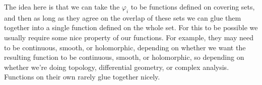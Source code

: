 \documentclass[fleqn]{NotesClass}
\begin{document}
    The idea here is that we can take the \(\varphi_i\) to be functions defined on covering sets, and then as long as they agree on the overlap of these sets we can glue them together into a single function defined on the whole set.
    For this to be possible we usually require some nice property of our functions.
    For example, they may need to be continuous, smooth, or holomorphic, depending on whether we want the resulting function to be continuous, smooth, or holomorphic, so depending on whether we're doing topology, differential geometry, or complex analysis.
    Functions on their own rarely glue together nicely.
    
    \appendixpage
    \begin{appendices}
        
        
    \end{appendices}
    \printbibliography
    \backmatter
    \renewcommand{\glossaryname}{Acronyms}
    \printglossary[acronym]
    \printindex
\end{document}
